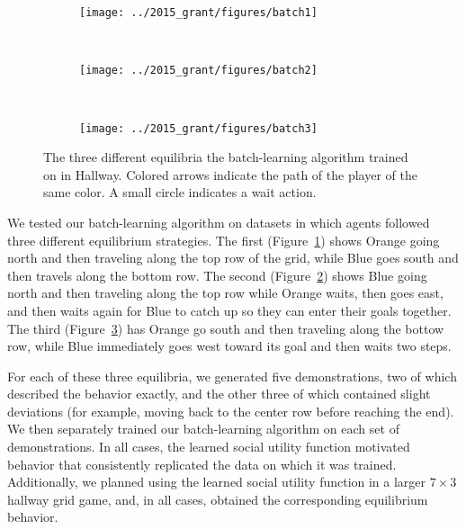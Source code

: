 
\begin{figure}
    \centering
    \begin{subfigure}[b]{0.275\textwidth}
        \texttt{[image: ../2015\_grant/figures/batch1]}
        \caption{}
        \label{fig:batch1}
    \end{subfigure}
\qquad
    ~ %
    \begin{subfigure}[b]{0.275\textwidth}
        \texttt{[image: ../2015\_grant/figures/batch2]}
        \caption{}
        \label{fig:batch2}
    \end{subfigure}
\qquad
    ~ %
    \begin{subfigure}[b]{0.275\textwidth}
        \texttt{[image: ../2015\_grant/figures/batch3]}
        \caption{}
        \label{fig:batch3}
    \end{subfigure}
    \caption{The three different equilibria the batch-learning algorithm trained on in Hallway. Colored arrows indicate the path of the player of the same color. A small circle indicates a wait action.}\label{fig:batchRes}
\end{figure}

We tested our batch-learning algorithm on datasets in which
agents followed three different equilibrium strategies. 
The first (Figure~\ref{fig:batch1}) shows Orange going
north and then traveling along the top row of the grid, while Blue goes south and then travels along the bottom row. The second
(Figure~\ref{fig:batch2}) shows Blue going north and then
traveling along the top row while Orange waits, then goes
east, and then waits again for Blue to catch up so they can enter
their goals together.  The third (Figure~\ref{fig:batch3}) has 
Orange go south and then traveling along the bottow row, while
Blue immediately goes west toward its goal and then waits
two steps.

For each of these three equilibria, we generated five demonstrations,
two of which described the behavior exactly, and the other three of
which contained slight deviations (for example, moving back to the
center row before reaching the end). We then separately trained our
batch-learning algorithm on each set of demonstrations. In all cases, the
learned social utility function motivated behavior that consistently
replicated the data on which it was trained. Additionally, we planned
using the learned social utility function in a larger $7\times 3$ hallway grid
game, and, in all cases, obtained the corresponding equilibrium behavior.

